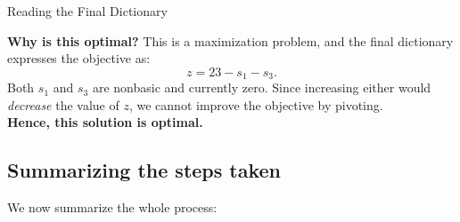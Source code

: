 \begin{remark}{Reading the Final Dictionary}{}
\begin{tikzpicture}[remember picture, overlay, >=stealth]
\end{tikzpicture}

\vspace{1em}

\textbf{Why is this optimal?}  
This is a maximization problem, and the final dictionary expresses the objective as:
\[
z = 23 - s_1 - s_3.
\]
Both \(s_1\) and \(s_3\) are nonbasic and currently zero. Since increasing either would \emph{decrease} the value of \(z\), we cannot improve the objective by pivoting.  
\\[0.5em]
\textbf{Hence, this solution is optimal.}
\end{remark}

\subsection{Summarizing the steps taken}
We now summarize the whole process:

